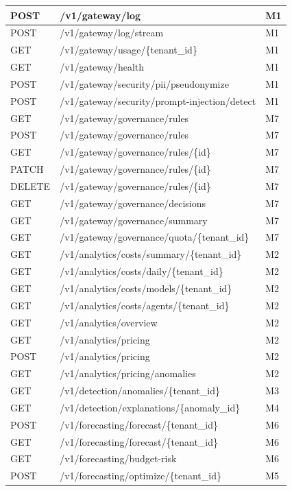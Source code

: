\documentclass[12pt,a4paper,twoside]{report}
\begin{document}
\begin{longtable}{|l|l|l|}
POST & /v1/gateway/log & M1 \\
\hline
POST & /v1/gateway/log/stream & M1 \\
\hline
GET & /v1/gateway/usage/\{tenant\_id\} & M1 \\
\hline
GET & /v1/gateway/health & M1 \\
\hline
POST & /v1/gateway/security/pii/pseudonymize & M1 \\
\hline
POST & /v1/gateway/security/prompt-injection/detect & M1 \\
\hline
GET & /v1/gateway/governance/rules & M7 \\
\hline
POST & /v1/gateway/governance/rules & M7 \\
\hline
GET & /v1/gateway/governance/rules/\{id\} & M7 \\
\hline
PATCH & /v1/gateway/governance/rules/\{id\} & M7 \\
\hline
DELETE & /v1/gateway/governance/rules/\{id\} & M7 \\
\hline
GET & /v1/gateway/governance/decisions & M7 \\
\hline
GET & /v1/gateway/governance/summary & M7 \\
\hline
GET & /v1/gateway/governance/quota/\{tenant\_id\} & M7 \\
\hline
GET & /v1/analytics/costs/summary/\{tenant\_id\} & M2 \\
\hline
GET & /v1/analytics/costs/daily/\{tenant\_id\} & M2 \\
\hline
GET & /v1/analytics/costs/models/\{tenant\_id\} & M2 \\
\hline
GET & /v1/analytics/costs/agents/\{tenant\_id\} & M2 \\
\hline
GET & /v1/analytics/overview & M2 \\
\hline
GET & /v1/analytics/pricing & M2 \\
\hline
POST & /v1/analytics/pricing & M2 \\
\hline
GET & /v1/analytics/pricing/anomalies & M2 \\
\hline
GET & /v1/detection/anomalies/\{tenant\_id\} & M3 \\
\hline
GET & /v1/detection/explanations/\{anomaly\_id\} & M4 \\
\hline
POST & /v1/forecasting/forecast/\{tenant\_id\} & M6 \\
\hline
GET & /v1/forecasting/forecast/\{tenant\_id\} & M6 \\
\hline
GET & /v1/forecasting/budget-risk & M6 \\
\hline
POST & /v1/forecasting/optimize/\{tenant\_id\} & M5 \\

\end{longtable}
\end{document}
